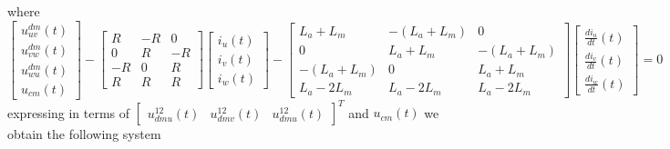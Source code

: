 \documentclass[11pt,a4paper]{scrartcl}
\numberwithin{equation}{section}
\theoremstyle{it}
\theoremstyle{definition}
\begin{document}
\begin{onehalfspace}
\begin{equation}
	\end{equation}
	where
	\begin{equation}
		\begin{bmatrix} u^{dm}_{uv}(t) \\[6pt] u^{dm}_{vw}(t) \\[6pt] u^{dm}_{wu}(t) \\[6pt] u_{cm}(t) \end{bmatrix} - \begin{bmatrix} R & -R & 0 \\ 0 & R & -R \\ -R & 0 & R \\ R & R & R \end{bmatrix} \begin{bmatrix} i_u(t) \\ i_v(t) \\ i_w(t) \end{bmatrix} - \begin{bmatrix} L_a+L_m & -(L_a+L_m) & 0 \\ 0 & L_a+L_m & -(L_a+L_m) \\ -(L_a+L_m) & 0 & L_a+L_m \\ L_a-2L_m & L_a-2L_m & L_a-2L_m \end{bmatrix} \begin{bmatrix} \frac{di_u}{dt}(t) \\ \frac{di_v}{dt}(t) \\ \frac{di_w}{dt}(t) \end{bmatrix} = 0
	\end{equation}
	expressing in terms of $\begin{bmatrix} u^{12}_{dmu}(t) & u^{12}_{dmv}(t) & u^{12}_{dmu}(t) \end{bmatrix}^{T}$ and $u_{cm}(t)$ we obtain the following system
	

\end{onehalfspace}
\end{document}
